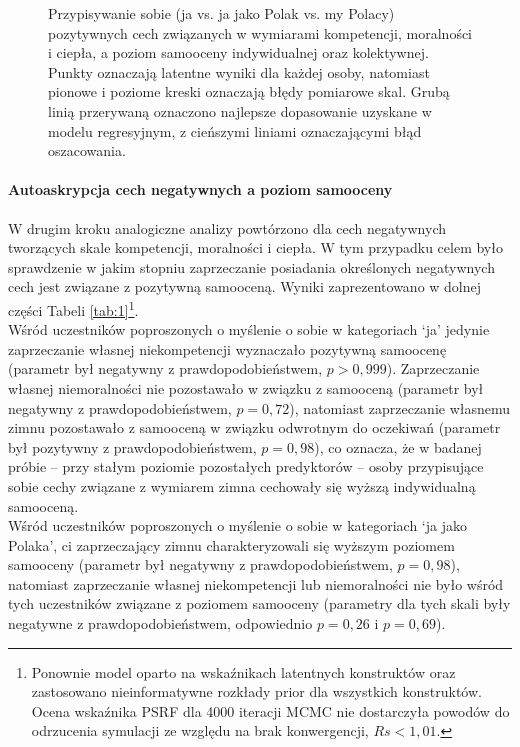 \documentclass[man]{apa6}
\begin{document}
\begin{figure*}[htbp]
   \centering
   \caption{Przypisywanie sobie (ja vs. ja jako Polak vs. my Polacy) pozytywnych cech związanych w wymiarami kompetencji, moralności i ciepła, a poziom samooceny indywidualnej oraz kolektywnej. Punkty oznaczają latentne wyniki dla każdej osoby, natomiast pionowe i poziome kreski oznaczają błędy pomiarowe skal. Grubą linią przerywaną oznaczono najlepsze dopasowanie uzyskane w modelu regresyjnym, z cieńszymi liniami oznaczającymi błąd oszacowania.}
   \label{fig:1}
\end{figure*}

\paragraph{Autoaskrypcja cech negatywnych a poziom samooceny}
W drugim kroku analogiczne analizy powtórzono dla cech negatywnych tworzących skale kompetencji, moralności i ciepła. W tym przypadku celem było sprawdzenie w jakim stopniu zaprzeczanie posiadania określonych negatywnych cech jest związane z pozytywną samooceną. Wyniki zaprezentowano w dolnej części Tabeli \ref{tab:1}\footnote{Ponownie model oparto na wskaźnikach latentnych konstruktów oraz zastosowano nieinformatywne rozkłady prior dla wszystkich konstruktów. Ocena wskaźnika PSRF dla 4000 iteracji MCMC nie dostarczyła powodów do odrzucenia symulacji ze względu na brak konwergencji, $Rs < 1,01$.}. \\

Wśród uczestników poproszonych o myślenie o sobie w kategoriach `ja' jedynie zaprzeczanie własnej niekompetencji wyznaczało pozytywną samoocenę (parametr był negatywny z prawdopodobieństwem, $p > 0,999$). Zaprzeczanie własnej niemoralności nie pozostawało w związku z samooceną (parametr był negatywny z prawdopodobieństwem, $p = 0,72$), natomiast zaprzeczanie własnemu zimnu pozostawało z samooceną w związku odwrotnym do oczekiwań (parametr był pozytywny z prawdopodobieństwem, $p = 0,98$), co oznacza, że w badanej próbie -- przy stałym poziomie pozostałych predyktorów -- osoby przypisujące sobie cechy związane z wymiarem zimna cechowały się wyższą indywidualną samooceną.\\

Wśród uczestników poproszonych o myślenie o sobie w kategoriach `ja jako Polaka', ci zaprzeczający zimnu charakteryzowali się wyższym poziomem samooceny (parametr był negatywny z prawdopodobieństwem, $p = 0,98$), natomiast zaprzeczanie własnej niekompetencji lub niemoralności nie było wśród tych uczestników związane z poziomem samooceny  (parametry dla tych skali były negatywne z prawdopodobieństwem, odpowiednio $p = 0,26$ i $p = 0,69$).\\
\end{document}
